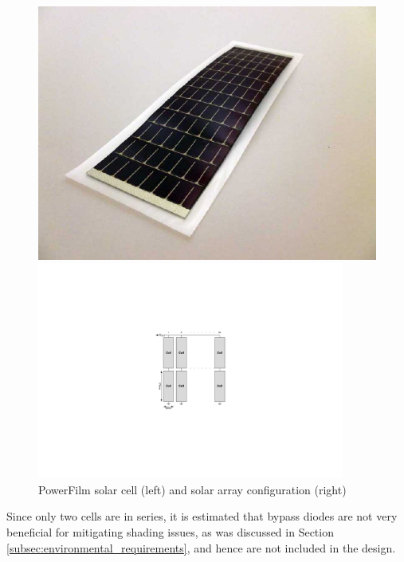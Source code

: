 \begin{figure}[H]
\centering
\begin{minipage}[c]{0.4\linewidth}
\centering
\includegraphics[width=\textwidth]{figures/SolarCell_RC7-2_Powerfilm}
\end{minipage}
\hspace{5mm}
\begin{minipage}[c]{0.55\linewidth}
\centering
\includegraphics[width=0.9\textwidth]{figures/fig_CDR_Solar_Array}
\end{minipage}
\caption[PowerFilm solar cell and solar array configuration]{PowerFilm solar cell (left) and solar array configuration (right)}
\label{fig:solar_cell}
\end{figure}
%
\noindent
Since only two cells are in series, it is estimated that bypass diodes are not very beneficial for mitigating shading issues, as was discussed in Section \ref{subsec:environmental_requirements}, and hence are not included in the design.
%
